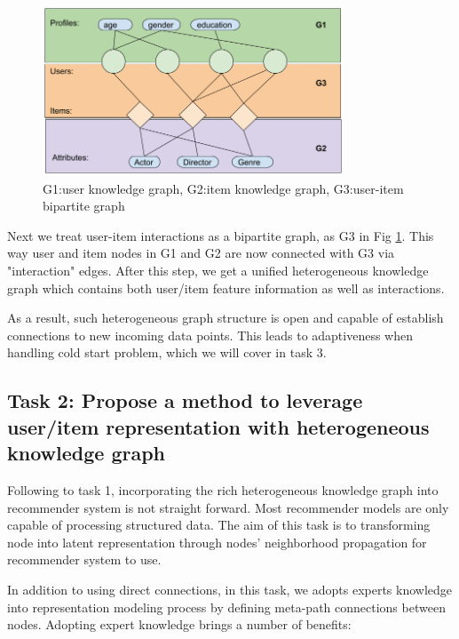 \begin{figure}[!h]
    \centering
    \includegraphics[width=0.8\textwidth]{figs/ikdiagram.png}
    \caption{G1:user knowledge graph, G2:item knowledge graph, G3:user-item bipartite graph}\label{fig:ikgraph}
\end{figure}

Next we treat user-item interactions as a bipartite graph, as G3 in Fig \ref{fig:ikgraph}. This way user and item nodes in G1 and G2 are now connected with G3 via "interaction" edges. After this step, we get a unified heterogeneous knowledge graph which contains both user/item feature information as well as interactions.

As a result, such heterogeneous graph structure is open and capable of establish connections to new incoming data points. This leads to adaptiveness when handling cold start problem, which we will cover in task 3.


\subsection*{Task 2: Propose a method to leverage user/item representation with heterogeneous knowledge graph}

Following to task 1, incorporating the rich heterogeneous knowledge graph into recommender system is not straight forward. Most recommender models are only capable of processing structured data. The aim of this task is to transforming node into latent representation through nodes' neighborhood propagation for recommender system to use.

In addition to using direct connections, in this task, we adopts experts knowledge into representation modeling process by defining meta-path connections between nodes. Adopting expert knowledge brings a number of benefits:

